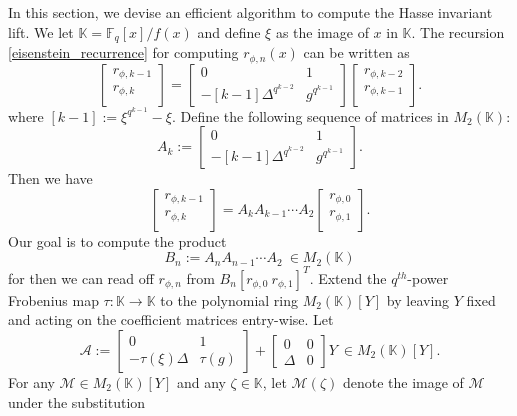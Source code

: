 \documentclass[12pt]{article}
\theoremstyle{plain}
\theoremstyle{definition}
\def\F{\ensuremath{\mathbb{F}}}
\def\K{\ensuremath{\mathbb{K}}}
\begin{document}
In this section, we devise an efficient algorithm to compute the Hasse invariant lift. We let $\K = 
\F_q[x]/f(x)$ and define $\xi$ as the image of $x$ in $\K$. The recursion  
\eqref{eisenstein_recurrence} for computing $r_{\phi,n}(x)$ can be written as
\[
\begin{bmatrix}
	r_{\phi,k - 1} \\
	r_{\phi,k} \\
\end{bmatrix} = 
\begin{bmatrix}
	0 & 1 \\
	-[k - 1]\Delta^{q^{k - 2}} & g^{q^{k - 1}}
\end{bmatrix}
\begin{bmatrix}
	r_{\phi,k - 2} \\
	r_{\phi,k - 1} \\
\end{bmatrix}.
\]
where $[k - 1]:=\xi^{q^{k - 1}}-\xi$. Define the following sequence of matrices in $M_2(\K)$:
\[
A_k :=
\begin{bmatrix}
	0 & 1 \\
	-[k - 1]\Delta^{q^{k - 2}} & g^{q^{k - 1}}
\end{bmatrix}.
\]
Then we have
\[
\begin{bmatrix}
	r_{\phi,k - 1} \\
	r_{\phi,k} \\
\end{bmatrix}
= A_kA_{k - 1} \cdots A_2
\begin{bmatrix}
	r_{\phi,0} \\
	r_{\phi,1} \\
\end{bmatrix}.
\]
Our goal is to compute the product 
\[B_n := A_nA_{n - 1} \cdots A_2 ~ \in M_2(\K)\]
for then we can read off $r_{\phi,n}$ from $B_n[r_{\phi,0} ~ r_{\phi,1}]^T$. Extend the  
$q^{th}$-power Frobenius map $\tau: \K \to \K$ to the polynomial ring $M_2(\K)[Y]$ by leaving $Y$ 
fixed and acting on the coefficient matrices entry-wise. Let
\[
\mathcal{A} := 
\begin{bmatrix}
	0 & 1 \\
	-\tau(\xi)\Delta & \tau(g)
\end{bmatrix}
+
\begin{bmatrix}
	0 & 0 \\
	\Delta & 0
\end{bmatrix} Y ~ \in M_2(\K)[Y].
\]
For any $\mathcal{M} \in M_2(\K)[Y]$ and any $\zeta \in \K$, let $\mathcal{M}(\zeta)$ denote the 
image of $\mathcal{M}$ under the substitution 
\end{document}
